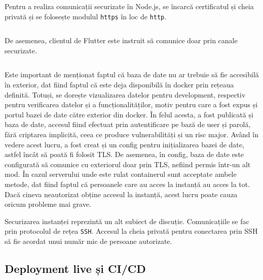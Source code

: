 Pentru a realiza comunicații securizate în Node.js, se încarcă certificatul și cheia privată și se folosește modulul \texttt{https} în loc de \texttt{http}.

\begin{code}
    \inputminted[frame=single,framesep=2mm,linenos,breaklines,tabsize=2]{javascript}{code/tls-https-node-js.js}
    \label{code:node_https_tls}
\end{code}

De asemenea, clientul de Flutter este instruit să comunice doar prin canale securizate.

\begin{code}
    \inputminted[frame=single,framesep=2mm,linenos,breaklines,tabsize=2]{dart}{code/tls-client.dart}
    \label{code:client_tls}
\end{code}

Este important de menționat faptul că baza de date nu ar trebuie să fie accesibilă în exterior, dat fiind faptul că este deja disponibilă în docker prin rețeaua definită. Totuși, se dorește vizualizarea datelor pentru development, respectiv pentru verificarea datelor și a funcționalităților, motiv pentru care a fost expus și portul bazei de date către exterior din docker. În felul acesta, a fost publicată și baza de date, accesul fiind efectuat prin autentificare pe bază de user și parolă, fără criptarea implicită, ceea ce produce vulnerabilități și un risc major. Având în vedere acest lucru, a fost creat și un config pentru inițializarea bazei de date, astfel încât să poată fi folosit TLS. De asemenea, în config, baza de date este configurată să comunice cu exteriorul doar prin TLS, nefiind permis într-un alt mod. În cazul serverului unde este rulat containerul sunt acceptate ambele metode, dat fiind faptul că persoanele care au acces la instanță au acces la tot. Dacă cineva neautorizat obține accesul la instanță, acest lucru poate cauza oricum probleme mai grave.

Securizarea instanței reprezintă un alt subiect de discuție. Comunicațiile se fac prin protocolul de rețea \texttt{SSH}. Accesul la cheia privată pentru conectarea prin SSH să fie acordat unui număr mic de persoane autorizate.

\subsection{Deployment live și CI/CD}

